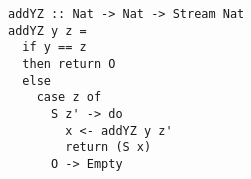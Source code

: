 \begin{figure}[!b]
  \centering
  \begin{minipage}{\columnwidth}
    \begin{lstlisting}[label={add_y_z}, caption={Function for \lstinline{addo out in in} direction}, captionpos=b, frame=tb]
addYZ :: Nat -> Nat -> Stream Nat
addYZ y z =
  if y == z
  then return O
  else
    case z of
      S z' -> do
        x <- addYZ y z'
        return (S x)
      O -> Empty
    \end{lstlisting}
  \end{minipage}
\end{figure}